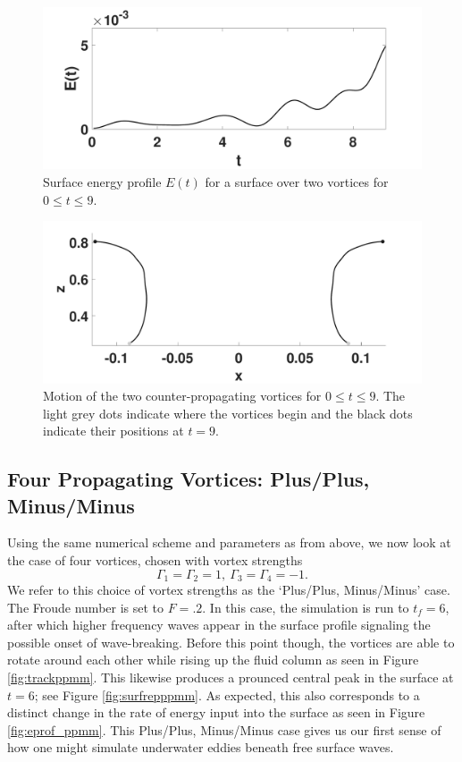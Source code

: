 \documentclass[a4paper,11pt]{article}
\begin{document}
\begin{figure}[!h]
\centering
\includegraphics[width=.75\textwidth]{energy_profile_mu_pt2_F_pt2_tv}
\caption{Surface energy profile $E(t)$ for a surface over two vortices for $0\leq t \leq 9$.}
\label{fig:eprof_tv}
\end{figure}
\begin{figure}[!h]
\centering
\includegraphics[width=.75\textwidth]{tracks_F_pt2_tf_9}
\caption{Motion of the two counter-propagating vortices for $0\leq t \leq 9$.  The light grey dots indicate where the vortices begin and the black dots indicate their positions at $t=9$.}
\label{fig:tracktv}
\end{figure}

\subsection{Four Propagating Vortices: Plus/Plus, Minus/Minus}
Using the same numerical scheme and parameters as from above, we now look at the case of four vortices, chosen with vortex strengths
\[
\Gamma_{1}=\Gamma_{2}=1, ~ \Gamma_{3}=\Gamma_{4}=-1.
\]
We refer to this choice of vortex strengths as the `Plus/Plus, Minus/Minus' case.  The Froude number is set to $F=.2$.  In this case, the simulation is run to $t_{f}=6$, after which higher frequency waves appear in the surface profile signaling the possible onset of wave-breaking.  Before this point though, the vortices are able to rotate around each other while rising up the fluid column as seen in Figure \ref{fig:trackppmm}.  This likewise produces a prounced central peak in the surface at $t=6$; see Figure \ref{fig:surfrepppmm}.  As expected, this also corresponds to a distinct change in the rate of energy input into the surface as seen in Figure \ref{fig:eprof_ppmm}.  This Plus/Plus, Minus/Minus case gives us our first sense of how one might simulate underwater eddies beneath free surface waves.  
\end{document}
